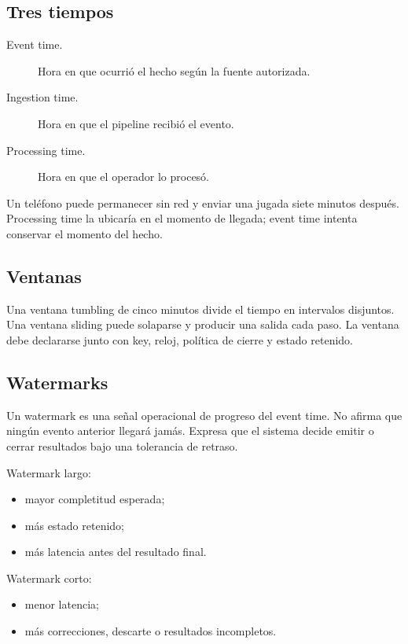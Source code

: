 \documentclass[variant=apuntes,cover=institutional,mode=screen]{ua-engineering-v6-article}
\begin{document}
\subsection{Tres tiempos}

\begin{description}
\item[Event time.] Hora en que ocurrió el hecho según la fuente autorizada.
\item[Ingestion time.] Hora en que el pipeline recibió el evento.
\item[Processing time.] Hora en que el operador lo procesó.
\end{description}

Un teléfono puede permanecer sin red y enviar una jugada siete minutos después. Processing time la ubicaría en el momento de llegada; event time intenta conservar el momento del hecho.

\subsection{Ventanas}

Una ventana tumbling de cinco minutos divide el tiempo en intervalos disjuntos. Una ventana sliding puede solaparse y producir una salida cada paso. La ventana debe declararse junto con key, reloj, política de cierre y estado retenido.

\subsection{Watermarks}

Un watermark es una señal operacional de progreso del event time. No afirma que ningún evento anterior llegará jamás. Expresa que el sistema decide emitir o cerrar resultados bajo una tolerancia de retraso.

Watermark largo:

\begin{itemize}
\item mayor completitud esperada;
\item más estado retenido;
\item más latencia antes del resultado final.
\end{itemize}

Watermark corto:

\begin{itemize}
\item menor latencia;
\item más correcciones, descarte o resultados incompletos.
\end{itemize}
\end{document}
